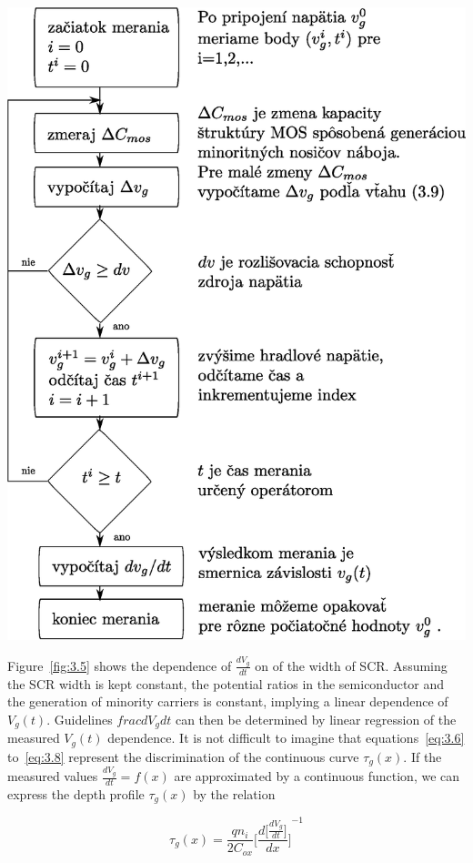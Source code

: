 \begin{diagram}
  \includegraphics[scale=0.55,keepaspectratio]{Figures/diagram-2.EPS}\label{diagram:2}
\end{diagram}

Figure~\ref{fig:3.5} shows the dependence of $\frac{dV_g}{dt}$ on
of the width of SCR\@. Assuming the SCR width is kept constant, the
potential ratios in the semiconductor and the generation of minority carriers is
constant, implying a linear dependence of $V_g(t)$.  Guidelines
${frac{dV_g}{dt}}$ can then be determined by linear regression of the measured
$V_g(t)$ dependence. It is not difficult to imagine that
equations~\ref{eq:3.6} to~\ref{eq:3.8} represent the discrimination
of the continuous curve $\tau_g(x)$. If the measured values
$\frac{dV_g}{dt}=f(x)$ are approximated by a continuous function, we can express
the depth profile $\tau_g(x)$ by the relation

\begin{equation}\label{eq:3.10}
  \tau_g(x) = \frac{qn_i}{2C_{ox}} {\Bigg[\frac{d\big[\frac{dV_g}{dt}\big]}{dx}\Bigg]}^{-1}
\end{equation}

